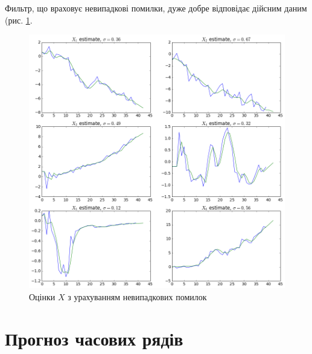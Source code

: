 Фильтр, що враховує невипадкові помилки,
дуже добре відповідає дійсним даним (рис. \ref{fig:x:trends:errors}.
\begin{figure}[h!]
  \centering
  \includegraphics[width=\textwidth]{Coursework2_files/Coursework2_9_0.png}
  \caption{Оцінки $X$ з урахуванням невипадкових помилок}
  \label{fig:x:trends:errors}
\end{figure}

\section{Прогноз часових рядів}

